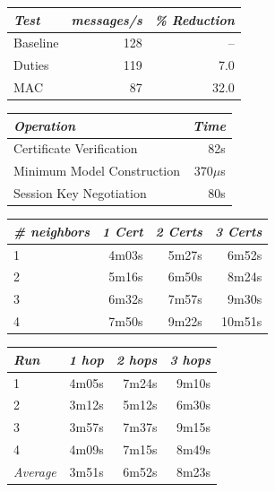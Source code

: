 
\centering
  \begin{tabular}{|l|r|r|} \hline
    \textit{Test} \T & \textit{messages/s} & \textit{\% Reduction} \\
    \hline \hline

    Baseline \T & 128 &   -- \\ \hline 
    Duties   \T & 119 &  7.0 \\ \hline
    MAC      \T &  87 & 32.0 \\ \hline
  \end{tabular}
\stopslide


\centering
  \begin{tabular}{|l|r|} \hline
    \textit{Operation} \T & \textit{Time} \\ \hline \hline

    Certificate Verification     \T &  82s \\ \hline 
    Minimum Model Construction   \T & 370$\mu$s \\ \hline
    Session Key Negotiation      \T &  80s\\ \hline
  \end{tabular}
\stopslide


\centering
  \begin{tabular}{|l|r|r|r|} \hline
    \textit{\# neighbors} \T & \textit{1 Cert }
                             & \textit{2 Certs}
                             & \textit{3 Certs} \\ \hline \hline

    1 \T &  4m03s & 5m27s &  6m52s \\ \hline
    2 \T &  5m16s & 6m50s &  8m24s \\ \hline
    3 \T &  6m32s & 7m57s &  9m30s \\ \hline
    4 \T &  7m50s & 9m22s & 10m51s \\ \hline
  \end{tabular}
\stopslide


\centering
  \begin{tabular}{|l|r|r|r|} \hline
    \textit{Run} \T & \textit{1 hop }
                    & \textit{2 hops}
                    & \textit{3 hops} \\ \hline \hline

                   1 \T &  4m05s & 7m24s & 9m10s \\ \hline
                   2 \T &  3m12s & 5m12s & 6m30s \\ \hline
                   3 \T &  3m57s & 7m37s & 9m15s \\ \hline
                   4 \T &  4m09s & 7m15s & 8m49s \\ \hline
    \textit{Average} \T &  3m51s & 6m52s & 8m23s \\ \hline
  \end{tabular}
\stopslide

